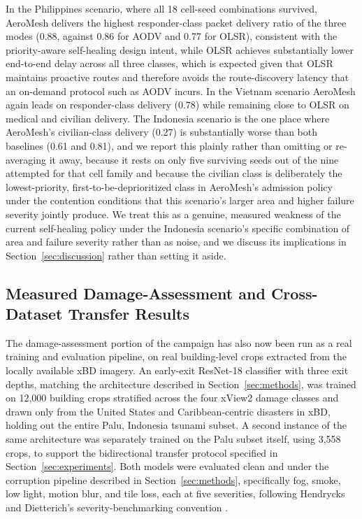 \documentclass[drones,article,submit,moreauthors]{Definitions/mdpi}
\begin{document}
In the Philippines scenario, where all 18 cell-seed combinations survived, AeroMesh delivers the highest responder-class packet delivery ratio of the three modes (0.88, against 0.86 for AODV and 0.77 for OLSR), consistent with the priority-aware self-healing design intent, while OLSR achieves substantially lower end-to-end delay across all three classes, which is expected given that OLSR maintains proactive routes and therefore avoids the route-discovery latency that an on-demand protocol such as AODV incurs. In the Vietnam scenario AeroMesh again leads on responder-class delivery (0.78) while remaining close to OLSR on medical and civilian delivery. The Indonesia scenario is the one place where AeroMesh's civilian-class delivery (0.27) is substantially worse than both baselines (0.61 and 0.81), and we report this plainly rather than omitting or re-averaging it away, because it rests on only five surviving seeds out of the nine attempted for that cell family and because the civilian class is deliberately the lowest-priority, first-to-be-deprioritized class in AeroMesh's admission policy under the contention conditions that this scenario's larger area and higher failure severity jointly produce. We treat this as a genuine, measured weakness of the current self-healing policy under the Indonesia scenario's specific combination of area and failure severity rather than as noise, and we discuss its implications in Section~\ref{sec:discussion} rather than setting it aside.

\subsection{Measured Damage-Assessment and Cross-Dataset Transfer Results}
\label{sec:results-inference}

The damage-assessment portion of the campaign has also now been run as a real training and evaluation pipeline, on real building-level crops extracted from the locally available xBD imagery. An early-exit ResNet-18 classifier with three exit depths, matching the architecture described in Section~\ref{sec:methods}, was trained on 12{,}000 building crops stratified across the four xView2 damage classes and drawn only from the United States and Caribbean-centric disasters in xBD, holding out the entire Palu, Indonesia tsunami subset. A second instance of the same architecture was separately trained on the Palu subset itself, using 3{,}558 crops, to support the bidirectional transfer protocol specified in Section~\ref{sec:experiments}. Both models were evaluated clean and under the corruption pipeline described in Section~\ref{sec:methods}, specifically fog, smoke, low light, motion blur, and tile loss, each at five severities, following Hendrycks and Dietterich's severity-benchmarking convention \cite{hendrycks2019benchmarking}.
\end{document}
